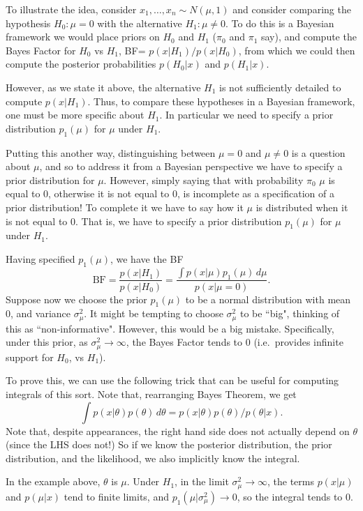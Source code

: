 \documentclass[12pt]{article}
\begin{document}
To illustrate the idea, consider
$x_1,\dots,x_n \sim N(\mu,1)$ and consider comparing the hypothesis $H_0: \mu=0$ with the alternative $H_1: \mu \neq 0$. 
To do this is a Bayesian framework we would
place priors on $H_0$ and $H_1$ ($\pi_0$ and $\pi_1$ say), and compute the Bayes Factor for $H_0$ vs $H_1$,
BF= $p(x | H_1)/p(x|H_0)$, from which we could
then compute the posterior probabilities $p(H_0|x)$ and $p(H_1 | x)$. 

However, as we state it above, the alternative $H_1$ is not sufficiently  detailed to compute $p(x | H_1)$. Thus, to compare these hypotheses in a Bayesian framework, one must be more specific
about $H_1$. In particular we need to specify a prior distribution $p_1(\mu)$ for $\mu$ under $H_1$.

Putting this another way, distinguishing between
$\mu=0$ and $\mu \neq 0$ is a question about $\mu$, and so to address it from a Bayesian perspective we have to specify a prior distribution for $\mu$. However, simply saying that with probability $\pi_0$ $\mu$ is equal to 0, otherwise
it is not equal to 0, is incomplete as a specification
of a prior distribution! To complete it we have to say how it $\mu$ is distributed when it is not equal to 0. That is, we have to specify a prior distribution $p_1(\mu)$ for $\mu$ under $H_1$.

Having specified $p_1(\mu)$, we have the BF
$$\text{BF} = \frac{p(x | H_1)}{p(x|H_0)} = \frac{\int p(x | \mu) p_1(\mu) \, d\mu}{p(x | \mu=0)}.$$
Suppose now we choose the prior $p_1(\mu)$ to be a normal distribution with mean 0, and variance 
$\sigma_\mu^2$. It might be tempting to choose $\sigma_\mu^2$ to be ``big", thinking of this as ``non-informative". However, this would be a big mistake. Specifically, under this prior, as $\sigma_\mu^2 \rightarrow \infty$, the Bayes Factor tends to 0 (i.e.~provides infinite support for $H_0$, vs $H_1$).

To prove this, we can use the following trick
that can be useful for computing integrals of this sort. Note that, rearranging Bayes Theorem,
we get
$$\int p(x | \theta) p(\theta) \,d\theta = p(x | \theta) p(\theta) / p(\theta | x).$$
Note that, despite appearances, the right hand side does not actually depend on $\theta$ (since the LHS does not!) So if we know the posterior distribution, the prior distribution, and the likelihood, we also implicitly know the integral.

In the example above, $\theta$ is $\mu$.
Under $H_1$, in the limit $\sigma_\mu^2 \rightarrow \infty$, the terms $p(x | \mu)$ and $p(\mu | x)$ tend to finite limits, and $p_1(\mu | \sigma_\mu^2) \rightarrow 0$, so the integral tends to 0.
\end{document}

